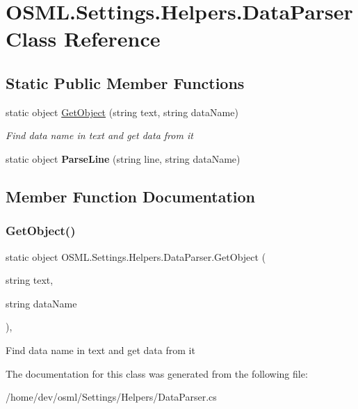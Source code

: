 \hypertarget{classOSML_1_1Settings_1_1Helpers_1_1DataParser}{}\section{O\+S\+M\+L.\+Settings.\+Helpers.\+Data\+Parser Class Reference}
\label{classOSML_1_1Settings_1_1Helpers_1_1DataParser}
\subsection*{Static Public Member Functions}
\begin{DoxyCompactItemize}
\item 
static object \mbox{\hyperlink{classOSML_1_1Settings_1_1Helpers_1_1DataParser_ad07e8ea65a759bbf209acf31ce7bceb7}{Get\+Object}} (string text, string data\+Name)
\begin{DoxyCompactList}\small\item\em Find data name in text and get data from it \end{DoxyCompactList}\item 
\mbox{\label{classOSML_1_1Settings_1_1Helpers_1_1DataParser_a9709053b285d0cc636bf8a745433c7c8}} 
static object {\bfseries Parse\+Line} (string line, string data\+Name)
\end{DoxyCompactItemize}


\subsection{Member Function Documentation}
\mbox{\label{classOSML_1_1Settings_1_1Helpers_1_1DataParser_ad07e8ea65a759bbf209acf31ce7bceb7}} 
\subsubsection{\texorpdfstring{GetObject()}{GetObject()}}
{\footnotesize\ttfamily static object O\+S\+M\+L.\+Settings.\+Helpers.\+Data\+Parser.\+Get\+Object (\begin{DoxyParamCaption}\item[{string}]{text,  }\item[{string}]{data\+Name }\end{DoxyParamCaption})\hspace{0.3cm}{\ttfamily [inline]}, {\ttfamily [static]}}



Find data name in text and get data from it 



The documentation for this class was generated from the following file\+:\begin{DoxyCompactItemize}
\item 
/home/dev/osml/\+Settings/\+Helpers/Data\+Parser.\+cs\end{DoxyCompactItemize}
